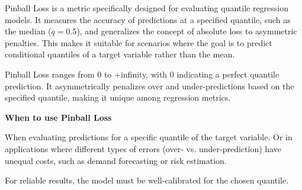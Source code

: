 Pinball Loss is a metric specifically designed for evaluating quantile regression models. It measures the accuracy of predictions at a specified quantile, such as the median ($q=0.5$),
and generalizes the concept of absolute loss to asymmetric penalties. This makes it suitable for scenarios where the goal is to predict conditional quantiles of a target variable
rather than the mean.

\begin{center}
\end{center}

Pinball Loss ranges from 0 to +infinity, with 0 indicating a perfect quantile prediction. It asymmetrically penalizes over and under-predictions based on the specified quantile,
making it unique among regression metrics.

\textbf{When to use Pinball Loss}

When evaluating predictions for a specific quantile of the target variable. Or in applications where different types of errors (over- vs. under-prediction) 
have unequal costs, such as demand forecasting or risk estimation.

{
    \item For reliable results, the model must be well-calibrated for the chosen quantile.
}

